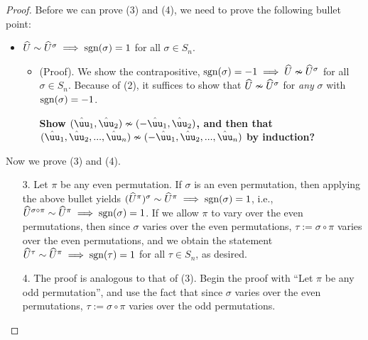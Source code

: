 \begin{proof}
    Before we can prove (3) and (4), we need to prove the following bullet point:

    \begin{itemize}
        \item $\widehat{U} \sim \widehat{U}^\sigma \implies \text{sgn}(\sigma) = 1$ for all $\sigma \in S_n$.
        \begin{itemize}
            \item (Proof). We show the contrapositive, $\text{sgn}(\sigma) = -1 \implies \widehat{U} \nsim \widehat{U}^\sigma$ for all $\sigma \in S_n$. Because of (2), it suffices to show that $\widehat{U} \nsim \widehat{U}^\sigma$ for \textit{any} $\sigma$ with $\text{sgn}(\sigma) = -1$.

            \textbf{Show $(\huu_1, \huu_2) \nsim (-\huu_1, \huu_2)$, and then that $(\huu_1, \huu_2, ..., \huu_n) \nsim (-\huu_1, \huu_2, ..., \huu_n)$ by induction?}
        \end{itemize}
    \end{itemize}

    Now we prove (3) and (4).
    
    \begin{enumerate}
        \item[3.] Let $\pi$ be any even permutation. If $\sigma$ is an even permutation, then applying the above bullet yields $(\widehat{U}^\pi)^\sigma \sim \widehat{U}^\pi \implies \text{sgn}(\sigma) = 1$, i.e., $\widehat{U}^{\sigma \circ \pi} \sim \widehat{U}^\pi \implies \text{sgn}(\sigma) = 1$. If we allow $\pi$ to vary over the even permutations, then since $\sigma$ varies over the even permutations, $\tau := \sigma \circ \pi$ varies over the even permutations, and we obtain the statement $\widehat{U}^\tau \sim \widehat{U}^\pi \implies \text{sgn}(\tau) = 1$ for all $\tau \in S_n$, as desired.
        \item[4.] The proof is analogous to that of (3). Begin the proof with ``Let $\pi$ be any odd permutation'', and use the fact that since $\sigma$ varies over the even permutations, $\tau := \sigma \circ \pi$ varies over the odd permutations.
    \end{enumerate}
\end{proof}

